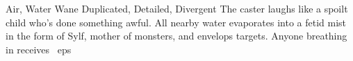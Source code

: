   {Air, Water}%
  {Wane}%
  {Duplicated, Detailed, Divergent}%
  {}%
  {
    The caster laughs like a spoilt child who's done something awful.
    All nearby water evaporates into a fetid mist in the form of Sylf, mother of monsters, and envelops  targets.
    Anyone breathing in receives \showDam~\glspl{ep}}%
  {}
